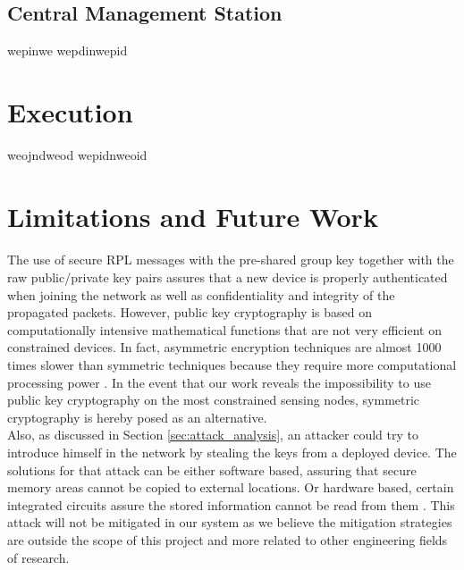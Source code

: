\subsection{Central Management Station}
\label{backend_services}

wepinwe
wepdinwepid
\section{Execution}

weojndweod
wepidnweoid

\section{Limitations and Future Work}
\paragraph{}
The use of secure RPL messages with the pre-shared group key together with the raw public/private key pairs assures that a new device is properly authenticated when joining the network as well as confidentiality and integrity of the propagated packets. However, public key cryptography is based on computationally intensive mathematical functions that are not very efficient on constrained devices. In fact, asymmetric encryption techniques are almost 1000 times slower than symmetric techniques because they require more computational processing power \cite{Kumar2011}. In the event that our work reveals the impossibility to use public key cryptography on the most constrained sensing nodes, symmetric cryptography is hereby posed as an alternative.\\
Also, as discussed in Section \ref{sec:attack_analysis}, an attacker could try to introduce himself in the network by stealing the keys from a deployed device. The solutions for that attack can be either software based, assuring that secure memory areas cannot be copied to external locations. Or hardware based, certain integrated circuits assure the stored information cannot be read from them \cite{Lesjak2014}. This attack will not be mitigated in our system as we believe the mitigation strategies are outside the scope of this project and more related to other engineering fields of research.\\